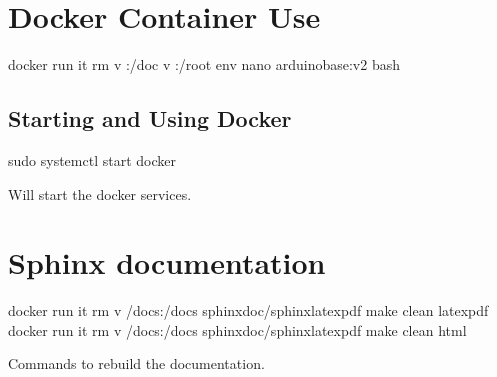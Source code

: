 \documentclass[letterpaper,10pt,english,openany,oneside]{sphinxmanual}
\begin{document}
\section{Docker Container Use}
\label{\detokenize{docker:docker-container-use}}
\begin{sphinxVerbatim}[commandchars=\\\{\},numbers=left,firstnumber=1,stepnumber=1]
docker run \PYGZhy{}it \PYGZhy{}\PYGZhy{}rm \PYGZhy{}v :/doc
                 \PYGZhy{}v :/root
                 \PYGZhy{}\PYGZhy{}env nano
                 arduino\PYGZus{}base:v2 bash
\end{sphinxVerbatim}


\subsection{Starting and Using Docker}
\label{\detokenize{docker:starting-and-using-docker}}
\begin{sphinxVerbatim}[commandchars=\\\{\}]
sudo systemctl start docker
\end{sphinxVerbatim}

\sphinxAtStartPar
Will start the docker services.


\section{Sphinx documentation}
\label{\detokenize{docker:sphinx-documentation}}
\begin{sphinxVerbatim}[commandchars=\\\{\},numbers=left,firstnumber=1,stepnumber=1]
docker run \PYGZhy{}it \PYGZhy{}\PYGZhy{}rm \PYGZhy{}v /docs:/docs sphinxdoc/sphinx\PYGZhy{}latexpdf make clean latexpdf
docker run \PYGZhy{}it \PYGZhy{}\PYGZhy{}rm \PYGZhy{}v /docs:/docs sphinxdoc/sphinx\PYGZhy{}latexpdf make clean html

Commands to rebuild the documentation.
\end{sphinxVerbatim}
\end{document}
